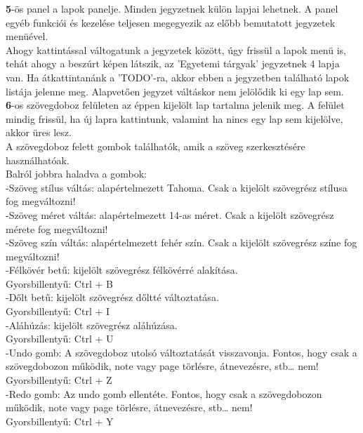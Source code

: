 \vspace{5pt} \noindent \textbf{5}-ös panel a lapok panelje. Minden jegyzetnek külön lapjai lehetnek. A panel egyéb funkciói és kezelése teljesen megegyezik az előbb bemutatott jegyzetek menüével.
\vspace{5pt} \\ Ahogy kattintással váltogatunk a jegyzetek között, úgy frissül a lapok menü is, tehát ahogy a beszúrt képen látszik, az ’Egyetemi tárgyak’ jegyzetnek 4 lapja van. Ha átkattintanánk a ’TODO’-ra, akkor ebben a jegyzetben található lapok listája jelenne meg. Alapvetően jegyzet váltáskor nem jelölődik ki egy lap sem. 
\vspace{10pt} \\ \textbf{6}-os szövegdoboz felületen az éppen kijelölt lap tartalma jelenik meg. A felület mindig frissül, ha új lapra kattintunk, valamint ha nincs egy lap sem kijelölve, akkor üres lesz.
\\A szövegdoboz felett gombok találhatók, amik a szöveg szerkesztésére használhatóak.
\\Balról  jobbra haladva a gombok: 
\vspace{5pt} \\-Szöveg stílus váltás: alapértelmezett Tahoma. Csak a kijelölt szövegrész stílusa fog megváltozni!
\vspace{5pt} \\-Szöveg méret váltás: alapértelmezett 14-as méret. Csak a kijelölt szövegrész mérete fog megváltozni!
\vspace{5pt} \\-Szöveg szín váltás: alapértelmezett fehér szín. Csak a kijelölt szövegrész színe fog megváltozni!
\vspace{5pt} \\-Félkövér betű: kijelölt szövegrész félkövérré alakítása.
\\Gyorsbillentyű: Ctrl + B
\vspace{5pt} \\-Dőlt betű: kijelölt szövegrész dőltté változtatása.
\\Gyorsbillentyű: Ctrl + I
\vspace{5pt} \\-Aláhúzás: kijelölt szövegrész aláhúzása.
\\Gyorsbillentyű: Ctrl + U
\vspace{5pt} \\-Undo gomb: A szövegdoboz utolsó változtatását visszavonja. Fontos, hogy csak a szövegdobozon működik, note vagy page törlésre, átnevezésre, stb… nem!
\\Gyorsbillentyű: Ctrl + Z
\vspace{5pt} \\-Redo gomb: Az undo gomb ellentéte. Fontos, hogy csak a szövegdobozon működik, note vagy page törlésre, átnevezésre, stb… nem!
\\Gyorsbillentyű: Ctrl + Y

